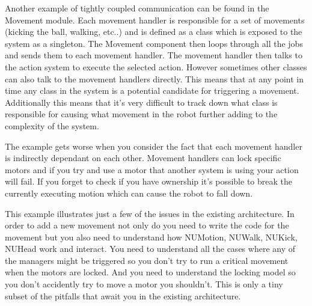 \documentclass[english,12pt]{scrartcl}
\begin{document}
            Another example of tightly coupled communication can be found in the Movement module.
            Each movement handler is responsible for a set of movements (kicking the ball, walking, etc..) and
            is defined as a class which is exposed to the system as a singleton.
            The Movement component then loops through all the jobs and sends them to each movement 
            handler.
            The movement handler then talks to the action system to execute the selected action. 
            However sometimes other classes can also talk to the movement handlers directly. 
            This means that at any point in time any class in the system is a potential candidate for
            triggering a movement. 
            Additionally this means that it's very difficult to track down what class is responsible for causing what
            movement in the robot further adding to the complexity of the system.

            The example gets worse when you consider the fact that each movement handler is indirectly dependant on
            each other. 
            Movement handlers can lock specific motors and if you try and use a motor that another system is using your action will fail.
            If you forget to check if you have ownership it's possible to break the currently executing motion which can cause the robot to fall down.
            
            This example illustrates just a few of the issues in the existing architecture.
            In order to add a new movement not only do you need to write the code for the movement but
            you also need to understand how NUMotion, NUWalk, NUKick, NUHead work and interact. You need to
            understand all the cases where any of the managers might be triggered so you don't try to run a critical
            movement when the motors are locked. 
            And you need to understand the locking model so you don't accidently try to move a motor you shouldn't.
            This is only a tiny subset of the pitfalls that await you in the existing architecture.

            
\end{document}
